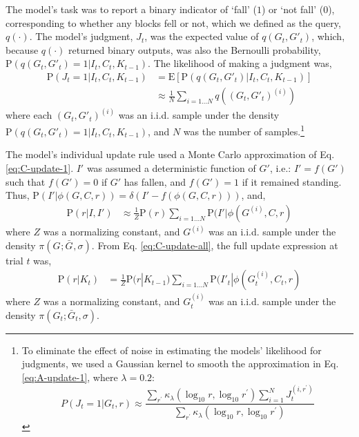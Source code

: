 \documentclass[10pt,letterpaper]{article}
\renewcommand{\Pr}[0]{\mathrm{P}}
\begin{document}
The model's task was to report a binary indicator of `fall' ($1$) or
`not fall' ($0$), corresponding to whether any blocks fell or not,
which we defined as the query, $q(\cdot)$. The model's judgment,
$J^{}_t$, was the expected value of $q(G^{}_t,G'_t)$, which, because
$q(\cdot)$ returned binary outputs, was also the Bernoulli
probability, $\Pr(q(G^{}_t,G'_t)=1|I^{}_t,C^{}_t,K^{}_{t-1})$. The
likelihood of making a judgment was,
\begin{align}
  \Pr(J^{}_t=1|I^{}_t,C^{}_t,K^{}_{t-1}) &=
  \mathrm{E}[\Pr(q(G^{}_t,G'_t)|I^{}_t,C^{}_t,K^{}_{t-1})] \nonumber \\
  &\approx \frac{1}{N} \sum_{i=1\dots N} q((G^{}_t,G'_t)^{(i)})
\label{eq:A-resp}
\end{align}
where each $(G^{}_t,G'_t)^{(i)}$ was an i.i.d. sample under the
density $\Pr(q(G^{}_t,G'_t)=1|I^{}_t,C^{}_t,K^{}_{t-1})$, and $N$ was
the number of samples.\footnote{To eliminate the effect of noise in
  estimating the models' likelihood for judgments, we used a Gaussian
  kernel to smooth the approximation in Eq. \ref{eq:A-update-1}, where
  $\lambda=0.2$:
\begin{equation}
  P(J_t=1|G_t,r) \approx \frac{\sum_{r^\prime}
    \kappa_\lambda(\log_{10}{r}, \log_{10}{r^\prime})\sum_{i=1}^N
    J_t^{(i,r^\prime)}}{\sum_{r^\prime} \kappa_\lambda(\log_{10}{r},
    \log_{10}{r^\prime})} 
\label{eq:A-resp-smooth}
\end{equation}}

The model's individual update rule used a Monte Carlo approximation of
Eq. \ref{eq:C-update-1}. $I'$ was assumed a deterministic
function of $G'$, i.e.: $I' = f(G')$ such that $f(G') = 0$ if $G'$ has
fallen, and $f(G') = 1$ if it remained standing. Thus,
$\Pr(I'|\phi(G,C,r)) = \delta(I'-f(\phi(G,C,r)))$, and,
\begin{align}
  \Pr(r|I,I') &\approx \frac{1}{Z}  \Pr(r) \sum_{i=1\dots N}
  \Pr(I'|\phi(G^{(i)},C,r)
\label{eq:A-update-1}
\end{align}
where $Z$ was a normalizing constant, and $G^{(i)}$ was an
i.i.d. sample under the density $\pi(G^{};\bar{G}^{},\sigma)$. From
Eq.  \ref{eq:C-update-all}, the full update expression at trial $t$
was,
\begin{align}
  \Pr(r|K^{}_t) &= \frac{1}{Z} \Pr(r|K^{}_{t-1}) \sum_{i=1\dots N}
    \Pr(I'_t|\phi(G^{(i)}_t,C^{}_t,r)
\label{eq:A-update-1}
\end{align}
where $Z$ was a normalizing constant, and $G^{(i)}_t$ was an i.i.d.
sample under the density $\pi(G^{}_t;\bar{G}^{}_t,\sigma)$.
\end{document}

